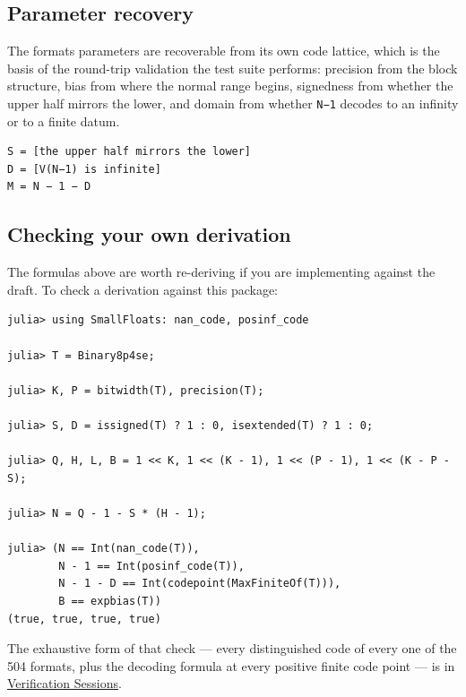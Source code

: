 \subsection{Parameter recovery}



\label{9976374482563203514}{}


The format{\textquotesingle}s parameters are recoverable from its own code lattice, which is the basis of the round-trip validation the test suite performs: precision from the block structure, bias from where the normal range begins, signedness from whether the upper half mirrors the lower, and domain from whether \texttt{N−1} decodes to an infinity or to a finite datum.




\begin{verbatim}
S = [the upper half mirrors the lower]
D = [V(N−1) is infinite]
M = N − 1 − D
\end{verbatim}



\subsection{Checking your own derivation}



\label{3942278927350838617}{}


The formulas above are worth re-deriving if you are implementing against the draft. To check a derivation against this package:




\nopagebreak[4]
\begin{verbatim}
julia> using SmallFloats: nan_code, posinf_code

julia> T = Binary8p4se;

julia> K, P = bitwidth(T), precision(T);

julia> S, D = issigned(T) ? 1 : 0, isextended(T) ? 1 : 0;

julia> Q, H, L, B = 1 << K, 1 << (K - 1), 1 << (P - 1), 1 << (K - P - S);

julia> N = Q - 1 - S * (H - 1);

julia> (N == Int(nan_code(T)),
        N - 1 == Int(posinf_code(T)),
        N - 1 - D == Int(codepoint(MaxFiniteOf(T))),
        B == expbias(T))
(true, true, true, true)
\end{verbatim}



The exhaustive form of that check — every distinguished code of every one of the 504 formats, plus the decoding formula at every positive finite code point — is in \href{examples\_\allowbreak{}verification.md}{Verification Sessions}.



